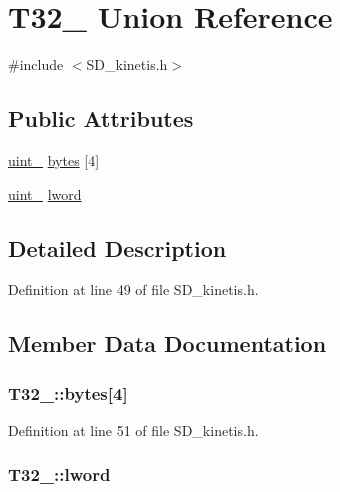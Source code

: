 \hypertarget{union_t32__8}{}\section{T32\+\_ Union Reference}
\label{union_t32__8}


{\ttfamily \#include $<$S\+D\+\_\+kinetis.\+h$>$}

\subsection*{Public Attributes}
\begin{DoxyCompactItemize}
\item 
\hyperlink{types_8h_ad3209046c23f739a81581c10a4be7d92}{uint\+\_} \hyperlink{union_t32__8_a822b7e3f41aa1f9f1ca44ccef1fb1d7b}{bytes} \mbox{[}4\mbox{]}
\item 
\hyperlink{types_8h_a5532400b872b4aa84e54335bf458a318}{uint\+\_} \hyperlink{union_t32__8_af1bd4ea2bbc459bff9d43a36738a824c}{lword}
\end{DoxyCompactItemize}


\subsection{Detailed Description}


Definition at line 49 of file S\+D\+\_\+kinetis.\+h.



\subsection{Member Data Documentation}
\subsubsection[{\texorpdfstring{bytes}{bytes}}]{ T32\+\_\+::bytes\mbox{[}4\mbox{]}}\hypertarget{union_t32__8_a822b7e3f41aa1f9f1ca44ccef1fb1d7b}{}\label{union_t32__8_a822b7e3f41aa1f9f1ca44ccef1fb1d7b}


Definition at line 51 of file S\+D\+\_\+kinetis.\+h.

\subsubsection[{\texorpdfstring{lword}{lword}}]{ T32\+\_\+::lword}\hypertarget{union_t32__8_af1bd4ea2bbc459bff9d43a36738a824c}{}\label{union_t32__8_af1bd4ea2bbc459bff9d43a36738a824c}



